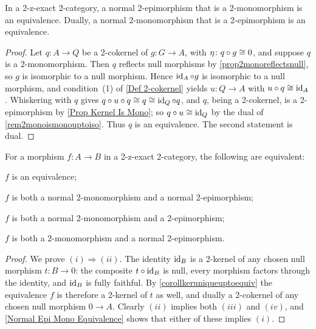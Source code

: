 \begin{proposition}
  \label{Normal Epi Mono Equivalence}   \leanok
  In a 2-z-exact 2-category, a normal 2-epimorphism that is a 2-monomorphism is an equivalence. Dually, a normal 2-monomorphism that is a 2-epimorphism is an equivalence.
\end{proposition}

\begin{proof}
  \leanok
  Let \(q\colon A\to Q\) be a 2-cokernel of \(g\colon G\to A\), with \(\eta\colon q\circ g\cong 0\), and suppose \(q\) is a 2-monomorphism. Then \(q\) reflects null morphisms by \prox\ref{prop2monoreflectsnull}, so \(g\) is isomorphic to a null morphism. Hence \(\operatorname{id}_{A}\circ g\) is isomorphic to a null morphism, and condition~(1) of \ref{Def 2-cokernel} yields \(u\colon Q\to A\) with \(u\circ q\cong\operatorname{id}_{A}\). Whiskering with \(q\) gives \(q\circ u\circ q\cong q\cong\operatorname{id}_{Q}\circ q\), and \(q\), being a 2-cokernel, is a 2-epimorphism by \prox\ref{Prop Kernel Is Mono}; so \(q\circ u\cong\operatorname{id}_{Q}\) by the dual of \remx\ref{rem2monoismonouptoiso}. Thus \(q\) is an equivalence. The second statement is dual.
\end{proof}

\begin{corollary}
  \label{Equivalence Is Mono Plus Normal Epi}   \leanok
  For a morphism \(f\colon A\to B\) in a 2-z-exact 2-category, the following are equivalent:
	\begin{tfae}
		\item \(f\) is an equivalence;
		\item \(f\) is both a normal 2-monomorphism and a normal 2-epimorphism;
		\item \(f\) is both a normal 2-monomorphism and a 2-epimorphism;
		\item \(f\) is both a 2-monomorphism and a normal 2-epimorphism.
	\end{tfae}
\end{corollary}

\begin{proof}
  \leanok
  We prove \((i)\Rightarrow(ii)\). The identity \(\operatorname{id}_{B}\) is a 2-kernel of any chosen null morphism \(t\colon B\to 0\): the composite \(t\circ\operatorname{id}_{B}\) is null, every morphism factors through the identity, and \(\operatorname{id}_{B}\) is fully faithful. By \corx\ref{corollkeruniqueuptoequiv} the equivalence \(f\) is therefore a 2-kernel of \(t\) as well, and dually a 2-cokernel of any chosen null morphism \(0\to A\). Clearly \((ii)\) implies both \((iii)\) and \((iv)\), and \prox\ref{Normal Epi Mono Equivalence} shows that either of these implies \((i)\).
\end{proof}

